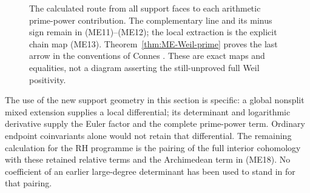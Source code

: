 \begin{figure}[ht]
\centering
{}
\caption{The calculated route from all support faces to each arithmetic
prime-power contribution. The complementary line and its minus sign remain
in (ME11)--(ME12); the local extraction is the explicit chain map (ME13).
Theorem~\ref{thm:ME-Weil-prime} proves the last arrow in the conventions of
Connes \cite{Connes1998,Connes2026}. These are exact maps and equalities,
not a diagram asserting the still-unproved full Weil positivity.}
\end{figure}

The use of the new support geometry in this section is specific: a global
nonsplit mixed extension supplies a local differential; its determinant
and logarithmic derivative supply the Euler factor and the complete
prime-power term. Ordinary endpoint coinvariants alone would not retain
that differential. The remaining calculation for the RH programme is the
pairing of the full interior cohomology with these retained relative terms
and the Archimedean term in (ME18). No coefficient of an earlier large-degree
determinant has been used to stand in for that pairing.
